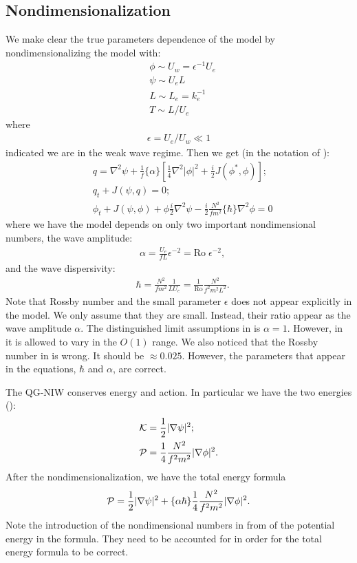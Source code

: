 \subsection{Nondimensionalization}
We make clear the true parameters dependence of the model by nondimensionalizing the model with:
\begin{align}
    &\phi \sim U_w = \epsilon^{-1} U_e\\
    &\psi \sim U_e L\\
    &L \sim L_e = k_e^{-1}\\
    &T \sim L/U_e
\end{align}
where
\begin{align}
    \epsilon = {U_e}/{U_w}\ll 1
\end{align}
indicated we are in the weak wave regime. Then we get (in the notation of \cite{Vallis_96a}):
\begin{align}
    &q = \nabla^2\psi + \frac{1}{f}\{\alpha\}\left[\frac{1}{4}\nabla^2|\phi|^2+\frac{i}{2}J(\phi^*,\phi)\right];\\
    &q_t + J(\psi,q) = 0;\\
    &\phi_t+J(\psi,\phi)+\phi\frac{i}{2}\nabla^2\psi-\frac{i}{2} \frac{N^2}{f m^2} \{\hbar\}\nabla^2\phi = 0\label{eq:QGNIW_eq3}
\end{align}
where we have the model depends on only two important nondimensional numbers, the wave amplitude:
\begin{align}
    &\alpha = \frac{U_e}{fL}\epsilon^{-2} = \text{Ro}\;\epsilon^{-2},
\end{align}
and the wave dispersivity:
\begin{align}
    &\hbar = \frac{N^2}{fm^2}\frac{1}{LU_e} = \frac{1}{\text{Ro}}\frac{N^2}{f^2 m^2 L^2}.
\end{align}
Note that Rossby number and the small parameter $\epsilon$ does not appear explicitly in the model. We only assume that they are small. Instead, their ratio appear as the wave amplitude $\alpha$. The distinguished limit assumptions in \cite{XieVanneste_15, WagnerYoung_15, WagnerYoung_16} is $\alpha = 1$. However, in \cite{RochaEtAl_18} it is allowed to vary in the $O(1)$ range. We also noticed that the Rossby number in \cite[Table 4]{RochaEtAl_18} is wrong. It should be $\approx 0.025$. However, the parameters that appear in the equations, $\hbar$ and $\alpha$, are correct.

The QG-NIW conserves energy and action. In particular we have the two energies (\cite[(3.2)]{RochaEtAl_18}):
\begin{align}
    &\mathcal{K} = \frac{1}{2}|\nabla\psi|^2;\\
    &\mathcal{P} = \frac{1}{4}\frac{N^2}{f^2m^2} |\nabla\phi|^2.
\end{align}
After the nondimensionalization, we have the total energy formula
\begin{align}
    \mathcal{P} = \frac{1}{2}|\nabla\psi|^2+\{\alpha\hbar\}\frac{1}{4}\frac{N^2}{f^2m^2} |\nabla\phi|^2.
\end{align}
Note the introduction of the nondimensional numbers in from of the potential energy in the formula. They need to be accounted for in order for the total energy formula to be correct. 

